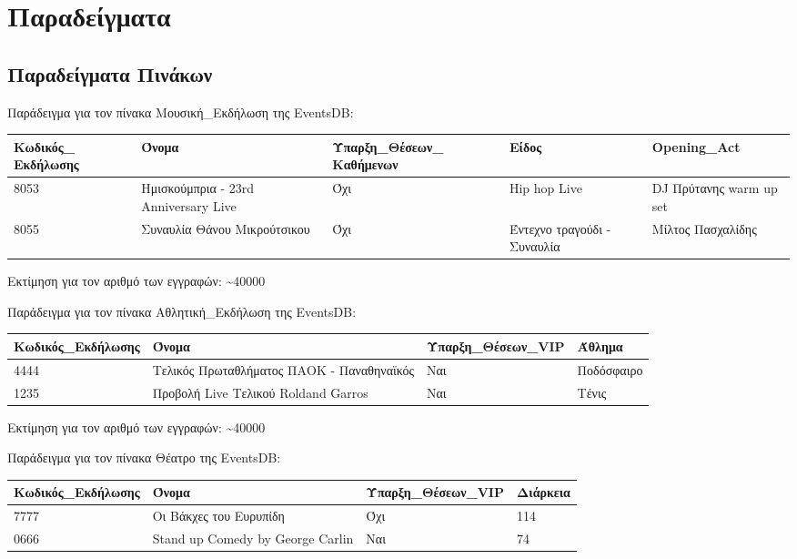 ﻿\section{Παραδείγματα}

\subsection{Παραδείγματα Πινάκων}

Παράδειγμα για τον πίνακα Μουσική\_Εκδήλωση της EventsDB:

\begin{table}[H]
  \centering
  \footnotesize
\begin{tabular}[c]{|p{2cm}|p{2.5cm}|p{2.5cm}|p{2cm}|p{3.5cm}|}
  \hline
  Κωδικός\_ Εκδήλωσης & Όνομα                           & Ύπαρξη\_Θέσεων\_ Καθήμενων & Είδος                       & Opening\_Act            \\ \hline
  8053                & Ημισκούμπρια - 23rd Anniversary Live & Όχι                         & Hip hop Live                & DJ Πρύτανης warm up set \\ \hline
  8055                & Συναυλία Θάνου Μικρούτσικου     & Όχι                         & Έντεχνο τραγούδι - Συναυλία & Μίλτος Πασχαλίδης       \\ \hline
\end{tabular}
\end{table}

Εκτίμηση για τον αριθμό των εγγραφών: \textasciitilde 40000

Παράδειγμα για τον πίνακα Αθλητική\_Εκδήλωση της EventsDB:

\begin{table}[H]
  \centering
  \footnotesize
  \begin{tabular}{|p{3cm}|p{4cm}|p{3cm}|p{3cm}|}
  \hline
  Κωδικός\_Εκδήλωσης & Όνομα & Ύπαρξη\_Θέσεων\_VIP & Άθλημα \\ \hline
  4444 & Τελικός Πρωταθλήματος ΠΑΟΚ - Παναθηναϊκός & Ναι & Ποδόσφαιρο \\ \hline
  1235 & Προβολή Live Τελικού Roldand Garros & Ναι & Τένις \\ \hline
\end{tabular}
\end{table}
  
Εκτίμηση για τον αριθμό των εγγραφών: \textasciitilde 40000

Παράδειγμα για τον πίνακα Θέατρο της EventsDB:

\begin{table}[H]
  \centering
  \footnotesize
  \begin{tabular}{|p{3cm}|p{4cm}|p{3cm}|p{3cm}|}
  \hline
  Κωδικός\_Εκδήλωσης & Όνομα & Ύπαρξη\_Θέσεων\_VIP & Διάρκεια \\ \hline
  7777 & Οι Βάκχες του Ευρυπίδη & Όχι & 114 \\ \hline
  0666 & Stand up Comedy by George Carlin & Ναι & 74 \\ \hline
\end{tabular}
\end{table}
  
